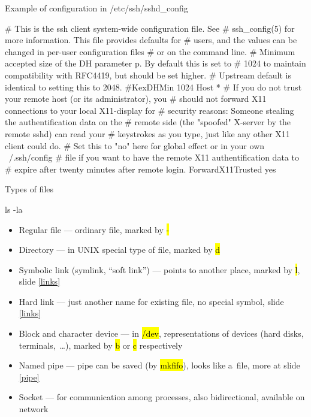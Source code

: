 \documentclass[compress, ucs, xelatex, 11pt, xcolor=svgnames,
  hyperref={
    bookmarks=true,
    unicode=true,
    colorlinks=true,
    pdftitle={Linux, command line and MetaCentrum},
    plainpages=false,
    pdfauthor={Vojtech Zeisek},
    pdfsubject={Course about use of Linux command line, writing shell scripts and using MetaCentrum of CESNET},
    pdfcreator={XeLaTeX},
    pdfkeywords={Linux, GNU, BASH, shell, command line, MetaCentrum},
    linkcolor=DarkRed,
    anchorcolor=DarkBlue,
    citecolor=Indigo,
    filecolor=NavyBlue,
    menucolor=DarkMagenta,
    urlcolor=DarkBlue,
    pdftex},
  url={hyphens, lowtilde} %
  ]{beamer}
\renewcommand{\texttt}[1]{\hl{\ttfamily #1}}
\begin{document}
\begin{frame}[fragile]{Example of configuration in /etc/ssh/sshd\_config}
  \begin{bashcode}
    # This is the ssh client system-wide configuration file.  See
    # ssh_config(5) for more information.  This file provides defaults for
    # users, and the values can be changed in per-user configuration files
    # or on the command line.
    # Minimum accepted size of the DH parameter p. By default this is set to
    # 1024 to maintain compatibility with RFC4419, but should be set higher.
    # Upstream default is identical to setting this to 2048.
    #KexDHMin 1024
    Host *
    # If you do not trust your remote host (or its administrator), you
    # should not forward X11 connections to your local X11-display for
    # security reasons: Someone stealing the authentification data on the
    # remote side (the "spoofed" X-server by the remote sshd) can read your
    # keystrokes as you type, just like any other X11 client could do.
    # Set this to "no" here for global effect or in your own ~/.ssh/config
    # file if you want to have the remote X11 authentification data to
    # expire after twenty minutes after remote login.
    ForwardX11Trusted yes
  \end{bashcode}
\end{frame}

\begin{frame}[fragile]{Types of files}
  \begin{bashcode}
    ls -la ~
  \end{bashcode}
  \begin{itemize}
    \item Regular file --- ordinary file, marked by \texttt{-}
    \item Directory --- in UNIX special type of file, marked by \texttt{d}
    \item Symbolic link (symlink, ``soft link'') --- points to another place, marked by \texttt{l}, slide \ref{links}
    \item Hard link --- just another name for existing file, no special symbol, slide \ref{links}
    \item Block and character device --- in \texttt{/dev}, representations of devices (hard disks, terminals,~\ldots), marked by \texttt{b} or \texttt{c} respectively
    \item Named pipe --- pipe can be saved (by \texttt{mkfifo}), looks like a~file, more at slide \ref{pipe}
    \item Socket --- for communication among processes, also bidirectional, available on network
  \end{itemize}
\end{frame}
\end{document}
